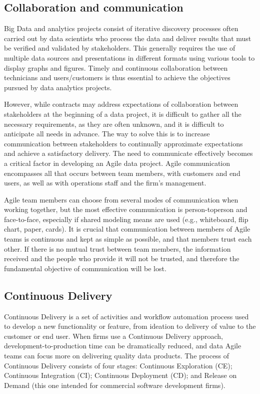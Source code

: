 \documentclass[
  letterpaper,
  DIV=11,
  numbers=noendperiod]{scrreprt}
\begin{document}
\hypertarget{collaboration-and-communication}{%
\subsection{Collaboration and
communication}\label{collaboration-and-communication}}

Big Data and analytics projects consist of iterative discovery processes
often carried out by data scientists who process the data and deliver
results that must be verified and validated by stakeholders. This
generally requires the use of multiple data sources and presentations in
different formats using various tools to display graphs and figures.
Timely and continuous collaboration between technicians and
users/customers is thus essential to achieve the objectives pursued by
data analytics projects.

However, while contracts may address expectations of collaboration
between stakeholders at the beginning of a data project, it is difficult
to gather all the necessary requirements, as they are often unknown, and
it is difficult to anticipate all needs in advance. The way to solve
this is to increase communication between stakeholders to continually
approximate expectations and achieve a satisfactory delivery. The need
to communicate effectively becomes a critical factor in developing an
Agile data project. Agile communication encompasses all that occurs
between team members, with customers and end users, as well as with
operations staff and the firm's management.

Agile team members can choose from several modes of communication when
working together, but the most effective communication is
person-toperson and face-to-face, especially if shared modeling means
are used (e.g., whiteboard, flip chart, paper, cards). It is crucial
that communication between members of Agile teams is continuous and kept
as simple as possible, and that members trust each other. If there is no
mutual trust between team members, the information received and the
people who provide it will not be trusted, and therefore the fundamental
objective of communication will be lost.

\hypertarget{continuous-delivery}{%
\subsection{Continuous Delivery}\label{continuous-delivery}}

Continuous Delivery is a set of activities and workflow automation
process used to develop a new functionality or feature, from ideation to
delivery of value to the customer or end user. When firms use a
Continuous Delivery approach, development-to-production time can be
dramatically reduced, and data Agile teams can focus more on delivering
quality data products. The process of Continuous Delivery consists of
four stages: Continuous Exploration (CE); Continuous Integration (CI);
Continuous Deployment (CD); and Release on Demand (this one intended for
commercial software development firms).
\end{document}
